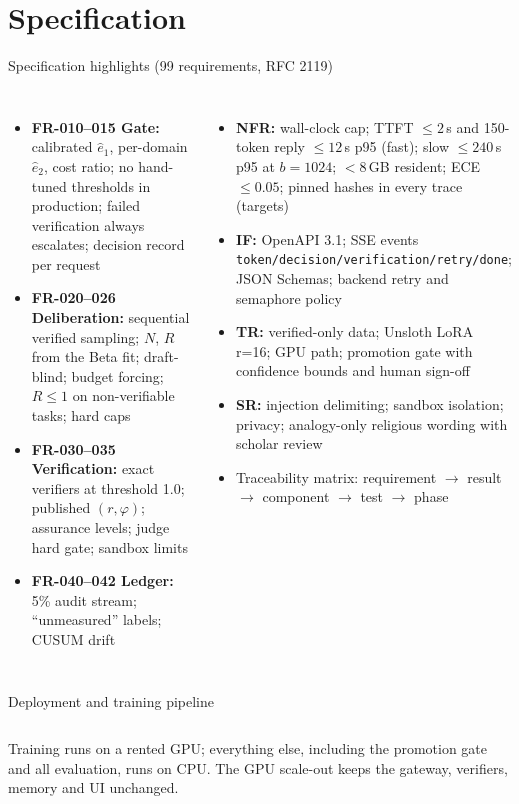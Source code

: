 \documentclass[aspectratio=169,10pt]{beamer}
\begin{document}
\section{Specification}
\begin{frame}{Specification highlights (99 requirements, RFC 2119)}
\scriptsize
\begin{columns}[T]
\begin{itemize}
\item \textbf{FR-010--015 Gate:} calibrated $\hat e_1$, per-domain $\hat e_2$, cost ratio; no hand-tuned thresholds in production; failed verification always escalates; decision record per request
\item \textbf{FR-020--026 Deliberation:} sequential verified sampling; $N$, $R$ from the Beta fit; draft-blind; budget forcing; $R\le1$ on non-verifiable tasks; hard caps
\item \textbf{FR-030--035 Verification:} exact verifiers at threshold 1.0; published $(r,\varphi)$; assurance levels; judge hard gate; sandbox limits
\item \textbf{FR-040--042 Ledger:} 5\% audit stream; ``unmeasured'' labels; CUSUM drift
\end{itemize}
\begin{itemize}
\item \textbf{NFR:} wall-clock cap; TTFT $\le2$\,s and 150-token reply $\le12$\,s p95 (fast); slow $\le240$\,s p95 at $b=1024$; $<8$\,GB resident; ECE $\le0.05$; pinned hashes in every trace (targets)
\item \textbf{IF:} OpenAPI 3.1; SSE events \texttt{token/decision/verification/retry/done}; JSON Schemas; backend retry and semaphore policy
\item \textbf{TR:} verified-only data; Unsloth LoRA r=16; GPU path; promotion gate with confidence bounds and human sign-off
\item \textbf{SR:} injection delimiting; sandbox isolation; privacy; analogy-only religious wording with scholar review
\item Traceability matrix: requirement $\to$ result $\to$ component $\to$ test $\to$ phase
\end{itemize}
\end{columns}
\end{frame}

\begin{frame}{Deployment and training pipeline}
\begin{columns}[T]
\centering\scalebox{0.5}{}
\centering\scalebox{0.78}{}
\end{columns}
\vspace{4pt}\small Training runs on a rented GPU; everything else, including the promotion gate and all evaluation, runs on CPU. The GPU scale-out keeps the gateway, verifiers, memory and UI unchanged.
\end{frame}
\end{document}
